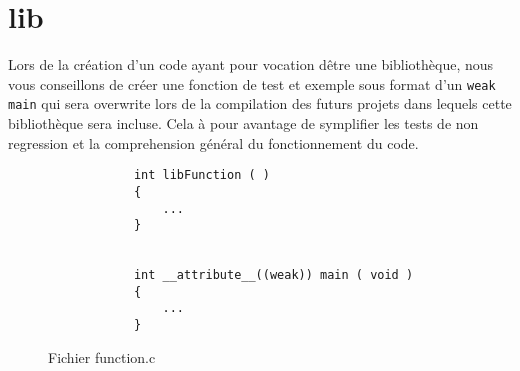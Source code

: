 \section{lib}
	Lors de la création d'un code ayant pour vocation dêtre une bibliothèque, nous vous conseillons de créer une fonction de test et exemple sous format d'un \verb+weak main+ qui sera overwrite lors de la compilation des futurs projets dans lequels cette bibliothèque sera incluse. Cela à pour avantage de symplifier les tests de non regression et la comprehension général du fonctionnement du code.

	\begin{figure}[H]
		\begin{changemargin}{-2.5cm}{-2.5cm}
		\begin{tcolorbox}
		\begin{verbatim}
			int libFunction ( )
			{
			    ...
			}

			
			int __attribute__((weak)) main ( void )
			{
				...
			}
		\end{verbatim}
		\end{tcolorbox}
		\end{changemargin}
		\caption{Fichier function.c}
	\end{figure}